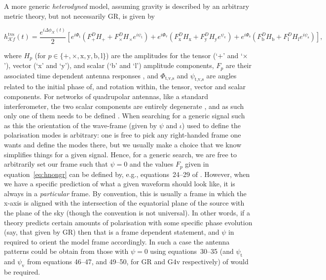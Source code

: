 A more generic {\it heterodyned} model, assuming gravity is described by an arbitrary metric theory, but not necessarily GR, is given by
\citep[see, e.g.][]{2015PhRvD..91h2002I,MaxCWpolariations}
\begin{widetext}
 \begin{equation}\label{eq:hnongr}
    h_{\mathcal{K}f}^{\text{tvs}}(t) =  \frac{e^{i\Delta\phi_{\mathcal{K}}(t)}}{2}\left[ e^{i\Phi_{\text{t}}}\left(F_+^DH_+ + F_{\times}^DH_{\times}e^{i\psi_{\text{t}}}\right)
    + e^{i\Phi_{\text{v}}}\left(F_{\text{x}}^DH_{\text{x}} + F_{\text{y}}^DH_{\text{y}}e^{\psi_{\text{v}}}\right) + e^{i\Phi_{\text{s}}}\left(F_{\text{b}}^DH_{\text{b}} + F_{\text{l}}^DH_{\text{l}}e^{i\psi_{\text{s}}} \right)\right],
 \end{equation}
\end{widetext}
where $H_{p}$ (for $p \in \{+,\times,\text{x},\text{y},\text{b},\text{l}\}$) are the amplitudes for the tensor (`$+$' and `$\times$'), vector (`x' and `y'),
and scalar (`b' and `l') \gw amplitude components, $F_{p}$ are their associated time dependent antenna responses
\citep[see, e.g.][]{2009PhRvD..79h2002N,2012PhRvD..85d3005B,2015PhRvD..91h2002I}, and $\Phi_{\text{t,v,s}}$ and $\psi_{\text{t,v,s}}$ are angles related to the initial
phase of, and rotation within, the tensor, vector and scalar components. For networks of quadrupolar antennas, like a standard \gw interferometer, the two scalar components are entirely
degenerate \citep{2014LRR....17....4W}, and as such only one of them needs to be defined \citep[e.g., only the `b' mode is used in Equation~19 of][]{MaxCWpolariations}. 
When searching for a generic signal such as this the orientation of the wave-frame (given by $\psi$ and $\iota$) used to define the polarisation modes is arbitrary:
one is free to pick any right-handed frame one wants and define the modes there, but we usually make a choice that we know simplifies things for a given signal.
Hence, for a generic search, we are free to arbitrarily set our frame such that $\psi=0$ and the values $F_{p}$ given in equation~\ref{eq:hnongr} can be defined
by, e.g., equations~24--29 of \citet{2015PhRvD..91h2002I}. However, when we have a specific prediction of what a given waveform should look like, it is always in a
{\it particular} frame. By convention, this is usually a frame in which the x-axis is aligned with the intersection of the equatorial plane of the source with the plane
of the sky (though the convention is not universal). In other words, if a theory predicts certain amounts of polarisation with some specific phase evolution (say,
that given by GR) then that is a frame dependent statement, and $\psi$ in required to orient the model frame accordingly. In such a case \citep[e.g., GR or some other
theory such as G4v in][]{2015arXiv150304866M} the antenna patterns could be obtain from those with $\psi=0$ using equations~30--35 (and $\psi_{\text{t}}$ and $\psi_{\text{v}}$
from equations 46--47, and 49--50, for GR and G4v respectively) of \citet{2015PhRvD..91h2002I} would be required.

